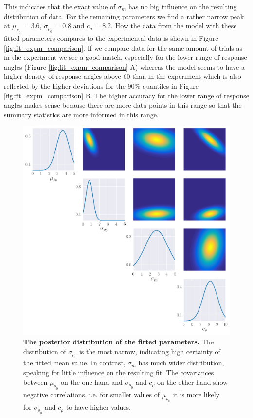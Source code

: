     This indicates that the exact value of $\sigma_m$ has no big influence on the resulting distribution of data.
    For the remaining parameters we find a rather narrow peak at $\mu_{\rho_0}$ = 3.6, $\sigma_{\rho_0}$ = 0.8 and $c_{\rho}$ = 8.2.
    How the data from the model with these fitted parameters compares to the experimental data is shown in Figure \ref{fig:fit_expm_comparison}.
    If we compare data for the same amount of trials as in the experiment we see a good match, especially for the lower range of response angles (Figure \ref{fig:fit_expm_comparison} A) whereas the model seems to have a higher density of response angles above 60\textdegree{} than in the experiment which is also reflected by the higher deviations for the 90\% quantiles in Figure \ref{fig:fit_expm_comparison} B.
    The higher accuracy for the lower range of response angles makes sense because there are more data points in this range so that the summary statistics are more informed in this range.
    \begin{figure}[H]
    \begin{center}
    \includegraphics[width=\textwidth]{figure_expm_fit_posterior.pdf}
    \end{center}
    \caption{\textbf{The posterior distribution of the fitted parameters.} The distribution of $\sigma_{\rho_0}$ is the most narrow, indicating high certainty of the fitted mean value. In contrast, $\sigma_{m}$ has much wider distribution, speaking for little influence on the resulting fit. The covariances between $\mu_{\rho_0}$ on the one hand and $\sigma_{\rho_0}$ and $c_{\rho}$ on the other hand show negative correlations, i.e. for smaller values of $\mu_{\rho_0}$ it is more likely for $\sigma_{\rho_0}$ and $c_{\rho}$ to have higher values.}
    \label{fig:fit_expm_post}
    \end{figure}
    
